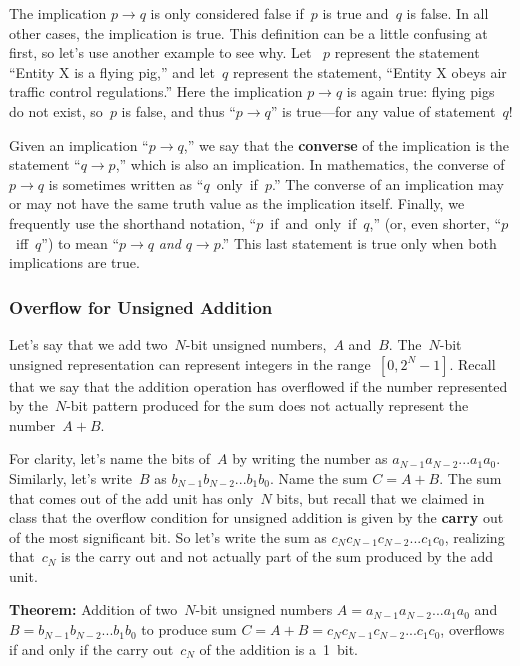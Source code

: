 The implication $p\rightarrow{q}$ 
is only considered false if~$p$ is true and~$q$ is false.
In all other cases, the implication is true.
This definition can be a little confusing at first, so let's use
another example to see why.
%
Let ~$p$ represent the statement
``Entity X is a flying pig,'' and let~$q$ represent 
the statement, ``Entity X obeys air traffic control regulations.''
%
Here the implication $p\rightarrow{q}$ is again true: 
flying pigs do not exist, so~$p$ is false, and thus 
``$p\rightarrow{q}$'' is true---for any value of statement~$q$!

Given an implication ``$p\rightarrow{q}$,'' we say that the {\bf
converse} of the implication is the statement 
``$q\rightarrow{p}$,'' which is also an implication.
In mathematics, the converse of 
$p\rightarrow{q}$
is sometimes written
as ``$q$~only~if~$p$.''  The converse of an implication may or may not have
the same truth value as the implication itself.  Finally,
we frequently use the shorthand notation, ``$p$~if~and~only~if~$q$,''
(or, even shorter, ``$p$~iff~$q$'') to mean 
``$p\rightarrow{q}$ {\em and}
$q\rightarrow{p}$.'' This last statement is true only when both
implications are true.\\

\subsubsection{Overflow for Unsigned Addition}

Let's say that we add two~\mbox{$N$-bit} unsigned numbers,~$A$
and~$B$.  The~\mbox{$N$-bit} unsigned representation 
can represent integers in the range~$[0,2^N-1]$.
%
Recall that we say that the addition operation has 
overflowed if the number represented by the~\mbox{$N$-bit} pattern
produced for the sum does not actually represent the number~$A+B$.

For clarity, let's name the bits of~$A$ by writing the number
as $a_{N-1}a_{N-2}...a_1a_0$.  Similarly, let's write~$B$ as
$b_{N-1}b_{N-2}...b_1b_0$.  Name the sum $C=A+B$.  The sum that
comes out of the add unit has only~$N$ bits, but recall that
we claimed in class that the overflow condition for unsigned 
addition is given by the {\bf carry} out of the most significant
bit.  So let's write the sum as 
$c_{N}c_{N-1}c_{N-2}...c_1c_0$, realizing that~$c_N$ is the
carry out and not actually part of the sum produced by the 
add unit.

{\bf Theorem:}
%
Addition of two~\mbox{$N$-bit} unsigned numbers
$A=a_{N-1}a_{N-2}...a_1a_0$
and
$B=b_{N-1}b_{N-2}...b_1b_0$
to produce sum
$C=A+B=c_{N}c_{N-1}c_{N-2}...c_1c_0$,
overflows if and only if
the carry out~$c_N$ of the addition is a~1~bit.

